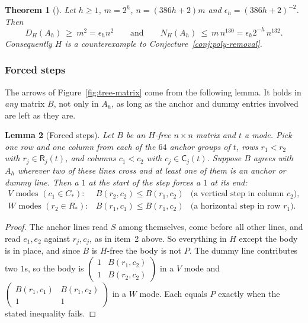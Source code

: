 \documentclass{article}
\theoremstyle{plain}
\newtheorem{theorem}{Theorem}
\newtheorem{lemma}[theorem]{Lemma}
\theoremstyle{definition}
\begin{document}
\begin{theorem}[{\cite[Theorem~1.1]{openai}}]\label{thm:openai}
Let $h\ge1$, $m=2^h$, $n=(386h+2)m$ and $\epsilon_h=(386h+2)^{-2}$. Then
\[
  D_H(A_h)\ \ge\ m^2=\epsilon_h n^2
  \qquad\text{and}\qquad
  N_H(A_h)\ \le\ m\,n^{130}=\epsilon_h2^{-h}\,n^{132}.
\]
Consequently $H$ is a counterexample to Conjecture~\ref{conj:poly-removal}.
\end{theorem}

\subsubsection*{Forced steps}

The arrows of Figure~\ref{fig:tree-matrix} come from the following lemma. It
holds in \emph{any} matrix $B$, not only in $A_h$, as long as the anchor and
dummy entries involved are left as they are.

\begin{lemma}[Forced steps]\label{lem:step}
Let $B$ be an $H$-free $n\times n$ matrix and $t$ a mode. Pick one row and one
column from each of the $64$ anchor groups of $t$, rows $r_1<r_2$ with
$r_j\in\mathsf R_j(t)$, and columns $c_1<c_2$ with $c_j\in\mathsf C_j(t)$.
Suppose $B$ agrees with $A_h$ wherever two of these lines cross and at least
one of them is an anchor or dummy line. Then a $1$ at the \emph{start} of the
step forces a $1$ at its \emph{end}:
\[
\begin{array}{lll}
  V\text{ modes }(c_1\in C_*): & B(r_2,c_2)\le B(r_1,c_2) & \text{(a vertical step in column } c_2),\\[2pt]
  W\text{ modes }(r_2\in R_*): & B(r_1,c_1)\le B(r_1,c_2) & \text{(a horizontal step in row } r_1).
\end{array}
\]
\end{lemma}

\begin{proof}
The anchor lines read $S$ among themselves, come before all other lines, and
read $e_1,e_2$ against $r_j,c_j$, as in item~2 above. So everything in $H$
except the body is in place, and since $B$ is $H$-free the body is not $P$. The
dummy line contributes two $1$s, so the body is
$\left(\begin{smallmatrix}1&B(r_1,c_2)\\1&B(r_2,c_2)\end{smallmatrix}\right)$
in a $V$ mode and
$\left(\begin{smallmatrix}B(r_1,c_1)&B(r_1,c_2)\\1&1\end{smallmatrix}\right)$
in a $W$ mode. Each equals $P$ exactly when the stated inequality fails.
\end{proof}
\end{document}
